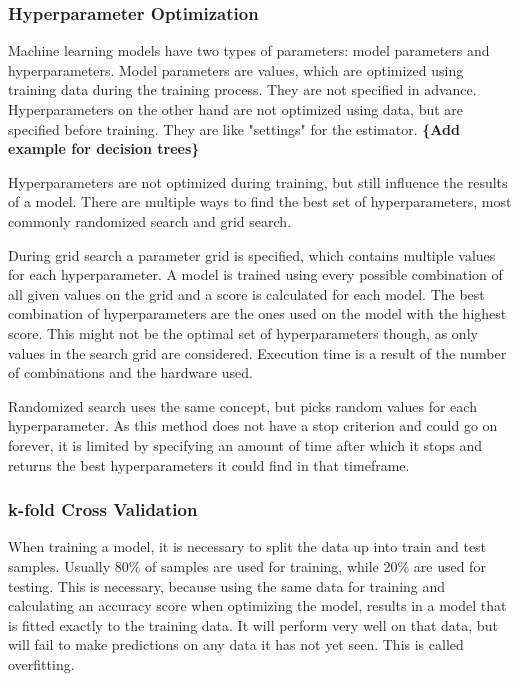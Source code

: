 \subsubsection{Hyperparameter Optimization}

Machine learning models have two types of parameters: model parameters and hyperparameters.
Model parameters are values, which are optimized using training data during the training process.
They are not specified in advance.
Hyperparameters on the other hand are not optimized using data, but are specified before training.
They are like "settings" for the estimator. 
\textbf{\{Add example for decision trees\}}

Hyperparameters are not optimized during training, but still influence the results of a model.
There are multiple ways to find the best set of hyperparameters, most commonly randomized search
and grid search.

During grid search a parameter grid is specified, which contains multiple values for each hyperparameter.
A model is trained using every possible combination of all given values on the grid and a score
is calculated for each model. The best combination of hyperparameters are the ones used on the model
with the highest score. This might not be the optimal set of hyperparameters though, as only values
in the search grid are considered. Execution time is a result of the number of combinations and the
hardware used.

Randomized search uses the same concept, but picks random values for each hyperparameter.
As this method does not have a stop criterion and could go on forever, it is limited by specifying
an amount of time after which it stops and returns the best hyperparameters it could find in
that timeframe.

\subsubsection{k-fold Cross Validation}

When training a model, it is necessary to split the data up into train and test samples.
Usually 80\% of samples are used for training, while 20\% are used for testing.
This is necessary, because using the same data for training and calculating an accuracy
score when optimizing the model, results in a model that is fitted exactly to the training
data. It will perform very well on that data, but will fail to make predictions on any data
it has not yet seen. This is called overfitting.

